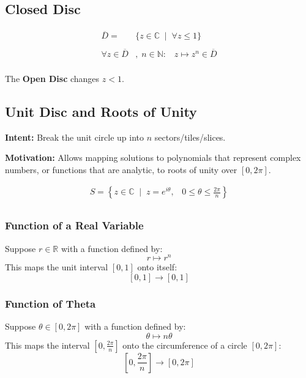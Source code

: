 \subsection{Closed Disc}
\begin{defn}
	\begin{align*}
		\overline{D} = &\{z \in \mathbb{C} \;\;|\;\; \forall z \leq 1 \} \\
		\\
		\forall z \in \overline{D}&, \; n \in \mathbb{N}: \;\;\; z \mapsto z^n \in \overline{D} \\
	\end{align*}
\end{defn}

The \textbf{Open Disc} changes $z < 1.$

\subsection{Unit Disc and Roots of Unity}

\textbf{Intent:} Break the unit circle up into $n$ sectors/tiles/slices.

\textbf{Motivation:} Allows mapping solutions to polynomials that represent complex numbers, or functions 
that are analytic, to roots of unity over $[0, 2\pi].$

\begin{defn}
	\begin{align*}
		S = \left\{ z \in \mathbb{C} \;\; | \;\; z = e^{i\theta} ,\;\;\;  0 \leq \theta \leq \frac{2\pi}{n} \right\} \\
	\end{align*}
\end{defn}

\subsubsection*{Function of a Real Variable}
Suppose $r \in \mathbb{R}$ with a function defined by:
\[r \mapsto r^n \]
This maps the unit interval $[0, 1]$ onto itself:
\[[0, 1] \to [0, 1] \]

\subsubsection*{Function of Theta}
Suppose $\theta \in [0, 2\pi]$ with a function defined by:
\[\theta \mapsto n\theta \]
This maps the interval $[0, \frac{2\pi}{n}]$ onto the circumference of a circle $[0, 2\pi]$:
\[ \left[ 0, \frac{2\pi}{n} \right] \to [0, 2\pi] \]

